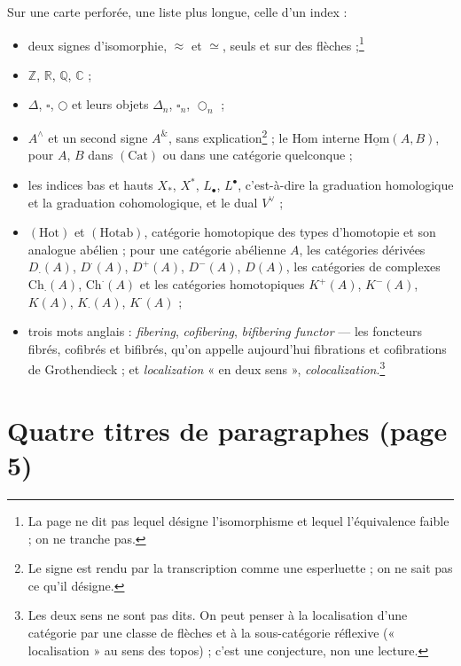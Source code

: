 \documentclass[11pt,a4paper]{article}
\begin{document}
Sur une carte perforée, une liste plus longue, celle d'un index :
\begin{itemize}
\item deux signes d'isomorphie, $\approx$ et $\simeq$, seuls et sur des
flèches ;\footnote{La page ne dit pas lequel désigne l'isomorphisme et lequel
l'équivalence faible ; on ne tranche pas.}
\item $\mathbb{Z}$, $\mathbb{R}$, $\mathbb{Q}$, $\mathbb{C}$ ;
\item $\Delta$, $\square$, $\bigcirc$ et leurs objets $\Delta_{n}$,
$\square_{n}$, $\bigcirc_{n}$ ;
\item $A^{\wedge}$ et un second signe $A^{\&}$, sans
explication\footnote{Le signe est rendu par la transcription comme une
esperluette ; on ne sait pas ce qu'il désigne.} ;
le Hom interne $\underline{\mathrm{Hom}}(A, B)$, pour $A$, $B$ dans
$(\mathrm{Cat})$ ou dans une catégorie quelconque ;
\item les indices bas et hauts $X_{*}$, $X^{*}$, $L_{\bullet}$, $L^{\bullet}$,
c'est-à-dire la graduation homologique et la graduation cohomologique, et le
dual $V^{\vee}$ ;
\item $(\mathrm{Hot})$ et $(\mathrm{Hotab})$, catégorie homotopique des types
d'homotopie et son analogue abélien ; pour une catégorie abélienne $A$, les
catégories dérivées
$D_{\cdot}(A)$, $D^{\cdot}(A)$, $D^{+}(A)$, $D^{-}(A)$, $D(A)$, les
catégories de complexes $\mathrm{Ch}_{\cdot}(A)$, $\mathrm{Ch}^{\cdot}(A)$ et
les catégories homotopiques $K^{+}(A)$, $K^{-}(A)$, $K(A)$, $K_{\cdot}(A)$,
$K^{\cdot}(A)$ ;
\item trois mots anglais : \emph{fibering}, \emph{cofibering},
\emph{bifibering functor} --- les foncteurs fibrés, cofibrés et bifibrés,
qu'on appelle aujourd'hui fibrations et cofibrations de Grothendieck ; et
\emph{localization} « en deux sens », \emph{colocalization}.\footnote{Les deux
sens ne sont pas dits. On peut penser à la localisation d'une catégorie par une
classe de flèches et à la sous-catégorie réflexive (« localisation » au sens
des topos) ; c'est une conjecture, non une lecture.}
\end{itemize}

\section*{Quatre titres de paragraphes (page 5)}
\end{document}
